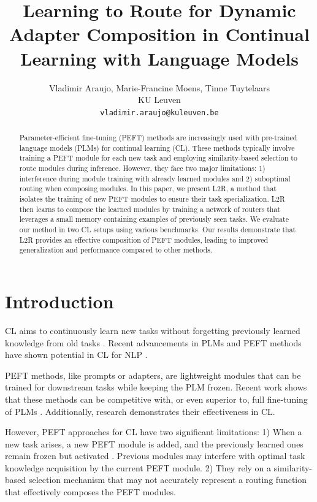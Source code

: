 \documentclass[11pt]{article}
\title{Learning to Route for Dynamic Adapter Composition in Continual Learning with Language Models}
\author{%
Vladimir Araujo, Marie-Francine Moens, Tinne Tuytelaars\\
KU Leuven\\
\texttt{vladimir.araujo@kuleuven.be}
}
\begin{document}
\maketitle

\begin{abstract}
Parameter-efficient fine-tuning (PEFT) methods are increasingly used with pre-trained language models (PLMs) for continual learning (CL). These methods typically involve training a PEFT module for each new task and employing similarity-based selection to route modules during inference. However, they face two major limitations: 1) interference during module training with already learned modules and 2) suboptimal routing when composing modules. In this paper, we present L2R, a method that isolates the training of new PEFT modules to ensure their task specialization. L2R then learns to compose the learned modules by training a network of routers that leverages a small memory containing examples of previously seen tasks. We evaluate our method in two CL setups using various benchmarks. Our results demonstrate that L2R provides an effective composition of PEFT modules, leading to improved generalization and performance compared to other methods.
\end{abstract}


\section{Introduction}

CL aims to continuously learn new tasks without forgetting previously learned knowledge from old tasks \cite{MCCLOSKEY1989109}. Recent advancements in PLMs and PEFT methods have shown potential in CL for NLP \cite{zhou2024continual}.

PEFT methods, like prompts or adapters, are lightweight modules that can be trained for downstream tasks while keeping the PLM frozen. Recent work shows that these methods can be competitive with, or even superior to, full fine-tuning of PLMs \cite{li-liang-2021-prefix,hu2022lora}. Additionally, research \cite{wang-etal-2023-rehearsal,wang2024rehearsalfree,Wang_2022_CVPR,Smith_2023_CVPR} demonstrates their effectiveness in CL.

However, PEFT approaches for CL have two significant limitations: 
1) When a new task arises, a new PEFT module is added, and the previously learned ones remain frozen but activated \cite{razdaibiedina2023progressive}. Previous modules may interfere with optimal task knowledge acquisition by the current PEFT module.
2) They rely on a similarity-based selection mechanism \cite{wang2024rehearsalfree} that may not accurately represent a routing function that effectively composes the PEFT modules.
\end{document}
